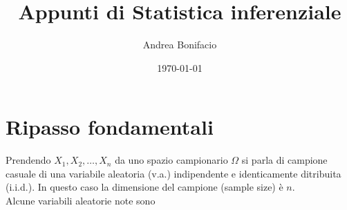 \documentclass[a4paper,12pt, draft]{article}
\theoremstyle{break}
\numberwithin{equation}{section}
\begin{document}
\title{Appunti di Statistica inferenziale}
\author{Andrea Bonifacio}
\date{\today}
\maketitle
\newpage
\section{Ripasso fondamentali}
Prendendo \(X_1, X_2, \ldots, X_n\) da uno spazio campionario \(\Omega\) si parla di campione casuale di una variabile aleatoria (v.a.) indipendente e identicamente ditribuita (i.i.d.). In questo caso la dimensione del campione (sample size) è \(n\). \\
Alcune variabili aleatorie note sono 
\end{document}
